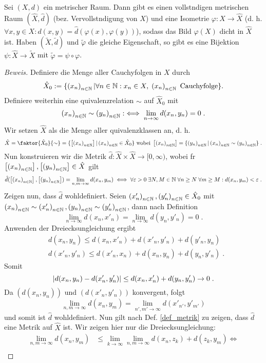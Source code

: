 \begin{theorem}
	Sei $(X,d)$ ein metrischer Raum. Dann gibt es einen vollst\as ndigen metrischen Raum $(\hat X, \hat d)$ (bez. Vervollst\as ndigung von $X$) und eine Isometrie \(\varphi: X \to \hat X\) (d. h. \(\forall x, y \in X: d(x,y) = \hat d (\varphi(x), \varphi(y))\)), sodass das Bild $\varphi(X)$ dicht in $\hat X$ ist. Haben $(\tilde X, \tilde d)$ und $\tilde \varphi$ die gleiche Eigenschaft, so gibt es eine Bijektion \(\psi: \hat X \to \tilde X\) mit \(\tilde \varphi = \psi \circ \varphi\).
	\label{vervollst_mR}
\end{theorem}
\begin{proof}[Beweis]
	Definiere die Menge aller Cauchyfolgen in $X$ durch 
	\[\hat X_0 := \{\left (x_n\right )_{n\in \mathbb{N}} \vert \forall n \in \mathbb{N}: x_n \in X, \; \left (x_n\right )_{n\in \mathbb{N}} \text{ Cauchyfolge}\}.\]
	Definiere weiterhin eine \As quivalenzrelation $\sim$ auf $\hat X_0$ mit 
	\[\left (x_n\right )_{n\in \mathbb{N}} \sim \left (y_n\right )_{n\in \mathbb{N}} :\iff \lim_{n\to\infty} d(x_n, y_n) = 0\;.\]
	Wir setzen $\hat X$ als die Menge aller \As quivalenzklassen an, d. h.
	\[\hat X = \faktor{\hat X_0}{\sim} = \{\equ{\seq xn} \vert \seq xn \in \hat X_0\} \text { wobei } \equ{\seq xn} = \{\seq yn \vert \seq xn \sim \seq yn\}\;. \]
	Nun konstruieren wir die Metrik $\hat d: \hat X \times \hat X \to  [0, \infty) $, wobei f\us r \(\left[ \left (x_n\right )_{n\in \mathbb{N}}\right], \left[ \left (y_n\right )_{n\in \mathbb{N}}\right] \in \hat X\) gilt
	\[\hat d(\left[ \left (x_n\right )_{n\in \mathbb{N}}\right], \left[ \left (y_n\right )_{n\in \mathbb{N}}\right]) = \lim_{n, m\to \infty} d(x_n, y_m) \iff \forall \varepsilon > 0 \;\exists N, M \in \mathbb{N}\;\forall n \geq N \; \forall m \geq M: d(x_n, y_m) < \varepsilon\; . \]
	Zeigen nun, dass $\hat d$ wohldefiniert. Seien $\left (x'_n\right )_{n\in \mathbb{N}}, \left (y'_n\right )_{n\in \mathbb{N}} \in \hat X_0$ mit \(\left (x_n\right )_{n\in \mathbb{N}} \sim \left (x'_n\right )_{n\in \mathbb{N}}, \left (y_n\right )_{n\in \mathbb{N}} \sim \left (y'_n\right )_{n\in \mathbb{N}}\), dann nach Definition
	\[\lim_{n \to \infty}d(x_n, x'_n) = \lim_{n\to\infty}d(y_n, y'_n) = 0\;.\]
	Anwenden der Dreiecksungleichung ergibt
	\begin{align*}
		& d(x_n, y_n) \leq d(x_n, x'_n) + d(x'_n, y'_n) + d(y'_n, y_n)\\
		&d(x'_n, y'_n) \leq d(x'_n, x_n) + d(x_n, y_n) + d(y_n, y'_n) \; .
	\end{align*}
	Somit
	\[\left\lvert d(x_n,y_n) - d(x'_n, y'_n) \right\rvert \leq d(x_n, x'_n) + d(y_n, y'_n) \to 0\;.\]
	Da $(d(x_n, y_n))$ und $(d(x'_n, y'_n))$ konvergent, folgt
	\[\lim_{n, m\to\infty} d(x_n, y_m) = \lim_{n',m'\to\infty} d(x'_{n'}, y'_{m'})\]
	und somit ist $\hat d$ wohldefiniert. Nun gilt nach Def. \ref{def_metrik} zu zeigen, dass $\hat d$ eine Metrik auf $\hat X$ ist. Wir zeigen hier nur die Dreiecksungleichung:
	\begin{align*}
		 \lim_{n, m \to \infty} d(x_n, y_m) &\leq \lim_{k\to\infty}\lim_{n,m \to\infty} d(x_n, z_k) + d(z_k, y_m) \iff \\

\end{align*}
\end{proof}
